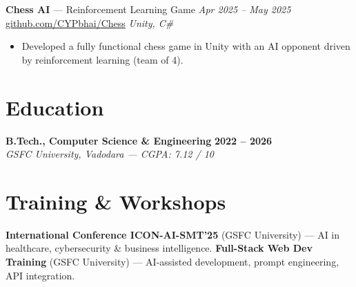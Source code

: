 \documentclass[a4paper,8pt]{extarticle}
\newcommand{\expitem}[4]{%
  \textbf{#1} \hfill \textbf{#3}\\
  \textit{#2} \hfill \textit{#4}\\
}
\begin{document}
\textbf{Chess AI} --- Reinforcement Learning Game \hfill \textit{Apr 2025 -- May 2025}\\
\href{https://github.com/CYPbhai/Chess/}{github.com/CYPbhai/Chess}
\textit{\quad Unity, C\#}
\begin{itemize}
  \item Developed a fully functional chess game in Unity with an AI opponent driven
        by reinforcement learning (team of 4).
\end{itemize}

\section{Education}
\expitem{B.Tech., Computer Science \& Engineering}{GSFC University, Vadodara --- CGPA: 7.12 / 10}{2022 -- 2026}{}

\section{Training \& Workshops}
\textbf{International Conference ICON-AI-SMT'25} (GSFC University) --- AI in healthcare, cybersecurity \& business intelligence. \quad \textbf{Full-Stack Web Dev Training} (GSFC University) --- AI-assisted development, prompt engineering, API integration.
\end{document}
